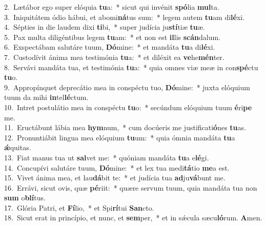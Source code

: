 {2.~}Lætábor ego super elóquia \textbf{tu}a:~* sicut qui invénit \textbf{spó}lia \textbf{mul}ta.\\
{3.~}Iniquitátem ódio hábui, et abomi\textbf{ná}tus sum:~* legem autem \textbf{tu}am di\textbf{lé}xi.\\
{4.~}Sépties in die laudem dixi \textbf{ti}bi,~* super judícia ju\textbf{stí}tiæ \textbf{tu}æ.\\
{5.~}Pax multa diligéntibus legem \textbf{tu}am:~* et non est \textbf{il}lis \textbf{scán}dalum.\\
{6.~}Exspectábam salutáre tuum, \textbf{Dó}mine:~* et mandáta \textbf{tu}a di\textbf{lé}xi.\\
{7.~}Custodívit ánima mea testimónia \textbf{tu}a:~* et diléxit ea \textbf{ve}he\textbf{mén}ter.\\
{8.~}Servávi mandáta tua, et testimónia \textbf{tu}a:~* quia omnes viæ meæ in con\textbf{spé}ctu \textbf{tu}o.\\
{9.~}Appropínquet deprecátio mea in conspéctu tuo, \textbf{Dó}mine:~* juxta elóquium tuum da mihi \textbf{in}tel\textbf{lé}ctum.\\
{10.~}Intret postulátio mea in conspéctu \textbf{tu}o:~* secúndum elóquium tuum \textbf{é}ri\textbf{pe} me.\\
{11.~}Eructábunt lábia mea \textbf{hym}num,~* cum docúeris me justificati\textbf{ó}nes \textbf{tu}as.\\
{12.~}Pronuntiábit lingua mea elóquium \textbf{tu}um:~* quia ómnia mandáta \textbf{tu}a \textbf{ǽ}quitas.\\
{13.~}Fiat manus tua ut \textbf{sal}vet me:~* quóniam mandáta \textbf{tu}a e\textbf{lé}gi.\\
{14.~}Concupívi salutáre tuum, \textbf{Dó}mine:~* et lex tua medi\textbf{tá}tio \textbf{me}a est.\\
{15.~}Vivet ánima mea, et lau\textbf{dá}bit te:~* et judícia tua \textbf{ad}ju\textbf{vá}bunt me.\\
{16.~}Errávi, sicut ovis, quæ \textbf{pé}riit:~* quære servum tuum, quia mandáta tua non \textbf{sum} o\textbf{blí}tus.\\
{17.~}Glória Patri, et \textbf{Fí}lio,~* et Spi\textbf{rí}tui \textbf{San}cto.\\
{18.~}Sicut erat in princípio, et nunc, et \textbf{sem}per,~* et in sǽcula sæcu\textbf{ló}rum. \textbf{A}men.\\
